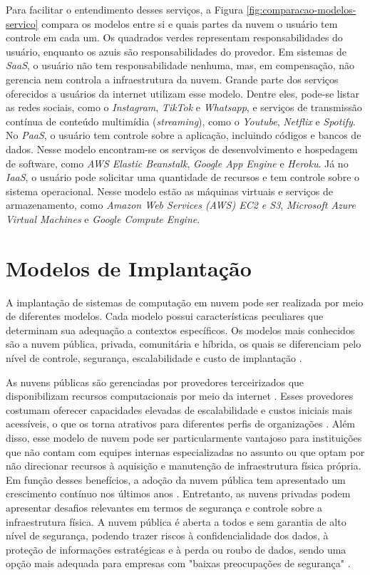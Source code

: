Para facilitar o entendimento desses serviços, a Figura \ref{fig:comparacao-modelos-servico} compara os modelos entre si e quais partes da nuvem o usuário tem controle em cada um. Os quadrados verdes representam responsabilidades do usuário, enquanto os azuis são responsabilidades do provedor. Em sistemas de \textit{SaaS}, o usuário não tem responsabilidade nenhuma, mas, em compensação, não gerencia nem controla a infraestrutura da nuvem. Grande parte dos serviços oferecidos a usuários da internet utilizam esse modelo. Dentre eles, pode-se listar as redes sociais, como o \textit{Instagram}, \textit{TikTok} e \textit{Whatsapp}, e serviços de transmissão contínua de conteúdo multimídia (\textit{streaming}), como o \textit{Youtube}, \textit{Netflix} e \textit{Spotify}.  No \textit{PaaS}, o usuário tem controle sobre a aplicação, incluindo códigos e bancos de dados. Nesse modelo encontram-se os serviços de desenvolvimento e hospedagem de software, como \textit{AWS Elastic Beanstalk}, \textit{Google App Engine} e \textit{Heroku}. Já no \textit{IaaS}, o usuário pode solicitar uma quantidade de recursos e tem controle sobre o sistema operacional. Nesse modelo estão as máquinas virtuais e serviços de armazenamento, como  \textit{Amazon Web Services (AWS) EC2 e S3},  \textit{Microsoft Azure Virtual Machines} e  \textit{Google Compute Engine}.

\section{Modelos de Implantação} 
A implantação de sistemas de computação em nuvem pode ser realizada por meio de diferentes modelos. Cada modelo possui características peculiares que determinam sua adequação a contextos específicos. Os modelos mais conhecidos são a nuvem pública, privada, comunitária e híbrida, os quais se diferenciam pelo nível de controle, segurança, escalabilidade e custo de implantação \cite{mell2011}.

As nuvens públicas são gerenciadas por provedores terceirizados que disponibilizam recursos computacionais por meio da internet \cite{carroll2011}. Esses provedores costumam oferecer capacidades elevadas de escalabilidade e custos iniciais mais acessíveis, o que os torna atrativos para diferentes perfis de organizações \cite{amajuoyi2024}. Além disso, esse modelo de nuvem pode ser particularmente vantajoso para instituições que não contam com equipes internas especializadas no assunto ou que optam por não direcionar recursos à aquisição e manutenção de infraestrutura física própria. Em função desses benefícios, a adoção da nuvem pública tem apresentado um crescimento contínuo nos últimos anos \cite{amajuoyi2024}. Entretanto, as nuvens privadas podem apresentar desafios relevantes em termos de segurança e controle sobre a infraestrutura física. A nuvem pública é aberta a todos e sem garantia de alto nível de segurança, podendo trazer riscos à confidencialidade dos dados, à proteção de informações estratégicas e à perda ou roubo de dados, sendo uma opção mais adequada para empresas com "baixas preocupações de segurança" \cite{sathya2023}.

